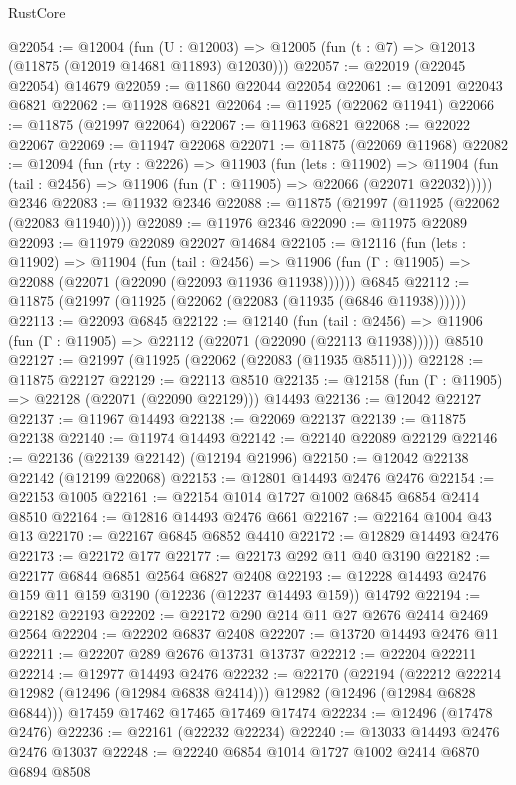 \begin{lexlean}{RustCore}
\begin{coremodule}
@22054 := @12004
    (fun (U : @12003) => @12005 (fun (t : @7) => @12013 (@11875 (@12019 @14681 @11893) @12030)))
@22057 := @22019 (@22045 @22054) @14679
@22059 := @11860 @22044 @22054
@22061 := @12091 @22043 @6821
@22062 := @11928 @6821
@22064 := @11925 (@22062 @11941)
@22066 := @11875 (@21997 @22064)
@22067 := @11963 @6821
@22068 := @22022 @22067
@22069 := @11947 @22068
@22071 := @11875 (@22069 @11968)
@22082 := @12094
    (fun (rty : @2226) =>
    @11903
      (fun (lets : @11902) =>
      @11904 (fun (tail : @2456) => @11906 (fun (Γ : @11905) => @22066 (@22071 @22032)))))
    @2346
@22083 := @11932 @2346
@22088 := @11875 (@21997 (@11925 (@22062 (@22083 @11940))))
@22089 := @11976 @2346
@22090 := @11975 @22089
@22093 := @11979 @22089 @22027 @14684
@22105 := @12116
    (fun (lets : @11902) =>
    @11904
      (fun (tail : @2456) =>
      @11906 (fun (Γ : @11905) => @22088 (@22071 (@22090 (@22093 @11936 @11938))))))
    @6845
@22112 := @11875 (@21997 (@11925 (@22062 (@22083 (@11935 (@6846 @11938))))))
@22113 := @22093 @6845
@22122 := @12140
    (fun (tail : @2456) => @11906 (fun (Γ : @11905) => @22112 (@22071 (@22090 (@22113 @11938)))))
    @8510
@22127 := @21997 (@11925 (@22062 (@22083 (@11935 @8511))))
@22128 := @11875 @22127
@22129 := @22113 @8510
@22135 := @12158 (fun (Γ : @11905) => @22128 (@22071 (@22090 @22129))) @14493
@22136 := @12042 @22127
@22137 := @11967 @14493
@22138 := @22069 @22137
@22139 := @11875 @22138
@22140 := @11974 @14493
@22142 := @22140 @22089 @22129
@22146 := @22136 (@22139 @22142) (@12194 @21996)
@22150 := @12042 @22138 @22142 (@12199 @22068)
@22153 := @12801 @14493 @2476 @2476
@22154 := @22153 @1005
@22161 := @22154 @1014 @1727 @1002 @6845 @6854 @2414 @8510
@22164 := @12816 @14493 @2476 @661
@22167 := @22164 @1004 @43 @13
@22170 := @22167 @6845 @6852 @4410
@22172 := @12829 @14493 @2476
@22173 := @22172 @177
@22177 := @22173 @292 @11 @40 @3190
@22182 := @22177 @6844 @6851 @2564 @6827 @2408
@22193 := @12228 @14493 @2476 @159 @11 @159 @3190 (@12236 (@12237 @14493 @159)) @14792
@22194 := @22182 @22193
@22202 := @22172 @290 @214 @11 @27 @2676 @2414 @2469 @2564
@22204 := @22202 @6837 @2408
@22207 := @13720 @14493 @2476 @11
@22211 := @22207 @289 @2676 @13731 @13737
@22212 := @22204 @22211
@22214 := @12977 @14493 @2476
@22232 := @22170
    (@22194
      (@22212 @22214 @12982 (@12496 (@12984 @6838 @2414)))
      @12982
      (@12496 (@12984 @6828 @6844)))
    @17459
    @17462
    @17465
    @17469
    @17474
@22234 := @12496 (@17478 @2476)
@22236 := @22161 (@22232 @22234)
@22240 := @13033 @14493 @2476 @2476 @13037
@22248 := @22240 @6854 @1014 @1727 @1002 @2414 @6870 @6894 @8508

\end{coremodule}
\end{lexlean}
